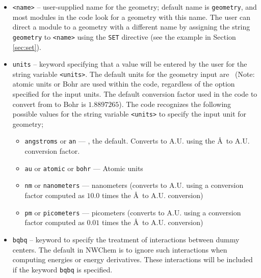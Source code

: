 \begin{itemize}
\item \verb+<name>+ -- user-supplied name for the geometry; default
name is \verb+geometry+, and
most modules in the code look for a geometry with this name.  The user
can direct a module to a geometry with a different name by assigning
the string \verb+geometry+ to \verb+<name>+ using the \verb+SET+
directive (see the example in Section \ref{sec:set}).

\item \verb+units+ -- keyword specifying that a value will be entered
  by the user for the string variable \verb+<units>+.  The default
  units for the geometry input are \angstroms\ (Note: atomic units or
  Bohr are used within the code, regardless of the option specified
  for the input units.  The default conversion factor used in the code
  to convert from {\angstroms} to Bohr is $1.8897265$).  The code recognizes
the following possible values for the string variable \verb+<units>+
to specify the input unit for geometry;
\begin{itemize}
  \item \verb+angstroms+ or \verb+an+ --- {\angstroms}, the default.  Converts
   to A.U. using the \AA\ to A.U. conversion factor.
  \item \verb+au+ or \verb+atomic+ or \verb+bohr+ --- Atomic units
  \item \verb+nm+ or \verb+nanometers+ --- nanometers (converts to
     A.U. using a conversion factor computed as $10.0$ times the
     \AA\ to A.U. conversion) 
  \item \verb+pm+ or \verb+picometers+ --- picometers (converts to 
    A.U. using a conversion factor computed as $0.01$ times the 
     \AA\ to A.U. conversion)
\end{itemize}
      
\item \verb+bqbq+ -- keyword to specify the treatment of interactions 
between dummy centers.  The default in NWChem is to ignore such interactions
when computing energies or energy derivatives.  These interactions
will be included if the keyword \verb+bqbq+ is specified.


\end{itemize}
